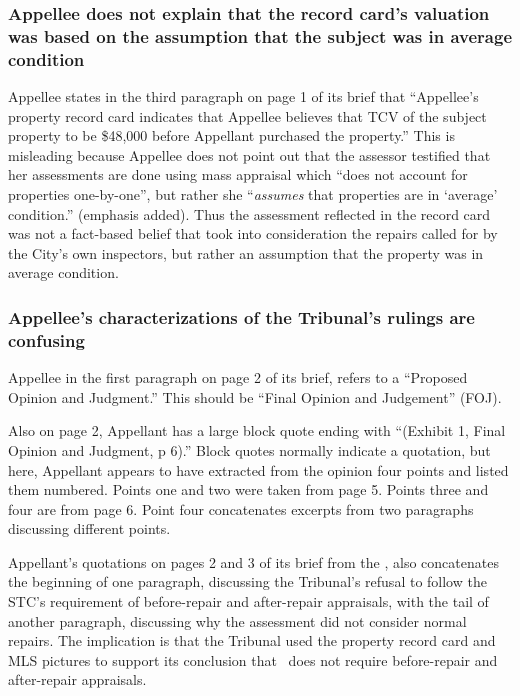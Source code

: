 \documentclass[12pt,\documentclassflag]{michiganCourtOfAppealsBrief}
\begin{document}
\subsubsection{Appellee does not explain that the record card's valuation was based on the assumption that the subject was in average condition}

Appellee states in the third paragraph on page 1 of its brief that ``Appellee's property record card indicates that Appellee believes that TCV of the subject property to be \$48,000 before Appellant purchased the property.'' This is misleading because Appellee does not point out that the assessor testified that her assessments are done using mass appraisal which ``does not account for properties one-by-one'', but rather she ``{\em assumes} that properties are in `average' condition.'' \foj[4] (emphasis added). Thus the assessment reflected in the record card was not a fact-based belief that took into consideration the repairs called for by the City's own inspectors, but rather an assumption that the property was in average condition.

\subsubsection{Appellee's characterizations of the Tribunal's rulings are confusing}

Appellee in the first paragraph on page 2 of its brief, refers to a ``Proposed Opinion and Judgment.'' This should be ``Final Opinion and Judgement'' (FOJ).

Also on page 2, Appellant has a large block quote ending with ``(Exhibit 1, Final Opinion and Judgment, p 6).'' Block quotes normally indicate a quotation, but here, Appellant appears to have extracted from the opinion four points and listed them numbered. Points one and two were taken from page 5. Points three and four are from page 6. Point four concatenates excerpts from two paragraphs discussing different points.

Appellant's quotations on pages 2 and 3 of its brief from the \reconsiderationDenied[2], also concatenates the beginning of one paragraph, discussing the Tribunal's refusal to follow the STC's requirement of before-repair and after-repair appraisals, with the tail of another paragraph, discussing why the assessment did not consider normal repairs. The implication is that the Tribunal used the property record card and MLS pictures to support its conclusion that \mathieuGast\ does not require before-repair and after-repair appraisals.
\end{document}
